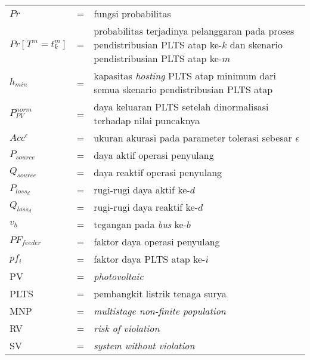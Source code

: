 {\begin{longtable}{llp{288pt}}
$Pr$	                        & = & fungsi probabilitas \\
$Pr[T^m=\mathit{t^m_k}]$ 		& = & probabilitas terjadinya pelanggaran pada proses pendistribusian PLTS atap ke-$k$ dan skenario pendistribusian PLTS atap ke-$m$\\
$h_{min}$						& = & kapasitas \textit{hosting} PLTS atap minimum dari semua skenario pendistribusian PLTS atap\\
$P^{norm}_{PV}$                 & = & daya keluaran PLTS setelah dinormalisasi terhadap nilai puncaknya\\
$Acc^{\epsilon}$                & = & ukuran akurasi pada parameter tolerasi sebesar $\epsilon$\\
$P_{source}$ 					& = & daya aktif operasi penyulang\\
$Q_{source}$ 					& = & daya reaktif operasi penyulang\\
$P_{loss_d}$ 					& = & rugi-rugi daya aktif ke-$d$\\
$Q_{loss_d}$ 					& = & rugi-rugi daya reaktif ke-$d$\\
$\mathit{v_b}$                  & = & tegangan pada \textit{bus} ke-$b$ \\
$\mathit{PF_{feeder}}$          & = & faktor daya operasi penyulang \\
$pf_i$							& = & faktor daya PLTS atap ke-$i$\\
PV                              & = & \textit{photovoltaic}\\
PLTS                            & = & pembangkit listrik tenaga surya\\
MNP								& = & \textit{multistage non-finite population}\\
RV                              & = & \textit{risk of violation}\\
SV                              & = & \textit{system without violation}
\end{longtable}
}